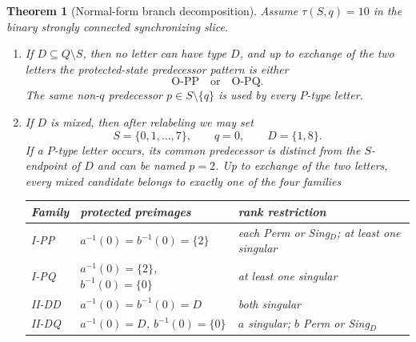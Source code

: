 \documentclass[11pt]{article}
\newtheorem{theorem}{Theorem}
\theoremstyle{definition}
\theoremstyle{remark}
\begin{document}
\begin{theorem}[Normal-form branch decomposition]\label{thm:families}
Assume $\tau(S,q)=10$ in the binary strongly connected synchronizing slice.
\begin{enumerate}[label=(\alph*)]
\item If $D\subseteq Q\setminus S$, then no letter can have type $D$, and up to exchange of the two letters the protected-state predecessor pattern is either
\[
\mathrm{O\!\text{-}PP}\quad\text{or}\quad\mathrm{O\!\text{-}PQ}.
\]
The same non-$q$ predecessor $p\in S\setminus\{q\}$ is used by every $P$-type letter.
\item If $D$ is mixed, then after relabeling we may set
\[
S=\{0,1,\ldots,7\},\qquad q=0,\qquad D=\{1,8\}.
\]
If a $P$-type letter occurs, its common predecessor is distinct from the $S$-endpoint of $D$ and can be named $p=2$. Up to exchange of the two letters, every mixed candidate belongs to exactly one of the four families
\begin{center}
\begin{tabular}{lll}
\toprule
Family & protected preimages & rank restriction\\
\midrule
I-PP & $a^{-1}(0)=b^{-1}(0)=\{2\}$ & each Perm or Sing$_D$; at least one singular\\
I-PQ & $a^{-1}(0)=\{2\}$, $b^{-1}(0)=\{0\}$ & at least one singular\\
II-DD & $a^{-1}(0)=b^{-1}(0)=D$ & both singular\\
II-DQ & $a^{-1}(0)=D$, $b^{-1}(0)=\{0\}$ & $a$ singular; $b$ Perm or Sing$_D$\\
\bottomrule
\end{tabular}
\end{center}
\end{enumerate}
\end{theorem}
\end{document}
